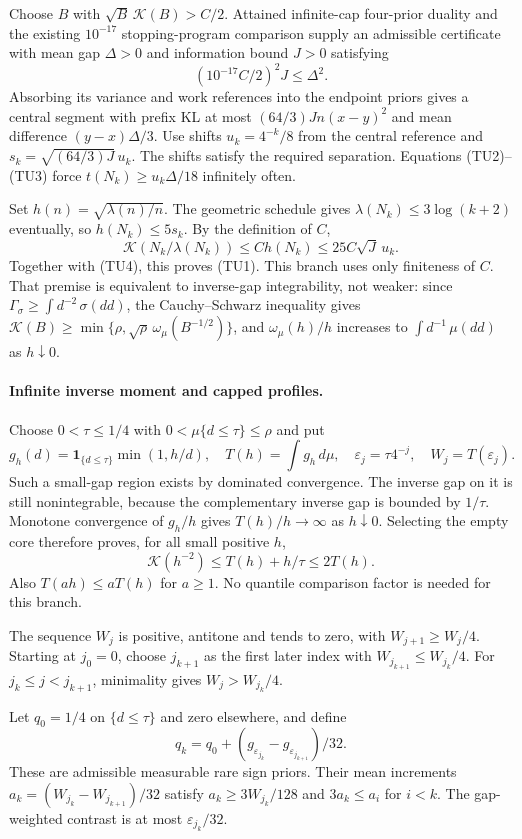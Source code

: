 Choose $B$ with $\sqrt B\,\mathcal K(B)>C/2$.
Attained infinite-cap four-prior duality and the existing
$10^{-17}$ stopping-program comparison supply an admissible certificate
with mean gap $\Delta>0$ and information bound $J>0$ satisfying
\[
 (10^{-17}C/2)^2J\le\Delta^2.
 \tag{TU4}
\]
Absorbing its variance and work references into the endpoint priors gives
a central segment with prefix KL at most
$(64/3)Jn(x-y)^2$ and mean difference $(y-x)\Delta/3$.
Use shifts $u_k=4^{-k}/8$ from the central reference and
$s_k=\sqrt{(64/3)J}\,u_k$. The shifts satisfy the required separation.
Equations (TU2)--(TU3) force $t(N_k)\ge u_k\Delta/18$ infinitely often.

Set $h(n)=\sqrt{\lambda(n)/n}$. The geometric schedule gives
$\lambda(N_k)\le3\log(k+2)$ eventually, so $h(N_k)\le5s_k$.
By the definition of $C$,
\[
 \mathcal K(N_k/\lambda(N_k))
 \le C h(N_k)\le25C\sqrt J\,u_k.
 \tag{TU5}
\]
Together with (TU4), this proves (TU1). This branch uses only finiteness
of $C$. That premise is equivalent to inverse-gap integrability, not
weaker: since $\Gamma_\sigma\ge\int d^{-2}\,\sigma(dd)$, the Cauchy--Schwarz
inequality gives
$\mathcal K(B)\ge\min\{\rho,\sqrt\rho\,\omega_\mu(B^{-1/2})\}$, and
$\omega_\mu(h)/h$ increases to $\int d^{-1}\,\mu(dd)$ as $h\downarrow0$.

\paragraph{Infinite inverse moment and capped profiles.}
Choose $0<\tau\le1/4$ with $0<\mu\{d\le\tau\}\le\rho$ and put
\[
 g_h(d)=\mathbf1_{\{d\le\tau\}}\min(1,h/d),\quad
 T(h)=\int g_h\,d\mu,\quad
 \varepsilon_j=\tau4^{-j},\quad W_j=T(\varepsilon_j).
\]
Such a small-gap region exists by dominated convergence. The inverse gap
on it is still nonintegrable, because the complementary inverse gap is
bounded by $1/\tau$. Monotone convergence of $g_h/h$ gives
$T(h)/h\to\infty$ as $h\downarrow0$.
Selecting the empty core therefore proves, for all small positive $h$,
\[
 \mathcal K(h^{-2})\le T(h)+h/\tau\le2T(h).
 \tag{TU6}
\]
Also $T(ah)\le aT(h)$ for $a\ge1$. No quantile comparison factor is needed
for this branch.

The sequence $W_j$ is positive, antitone and tends to zero, with
$W_{j+1}\ge W_j/4$. Starting at $j_0=0$, choose $j_{k+1}$ as the first
later index with $W_{j_{k+1}}\le W_{j_k}/4$.
For $j_k\le j<j_{k+1}$, minimality gives $W_j>W_{j_k}/4$.

Let $q_0=1/4$ on $\{d\le\tau\}$ and zero elsewhere, and define
\[
 q_k=q_0+(g_{\varepsilon_{j_k}}-g_{\varepsilon_{j_{k+1}}})/32.
\]
These are admissible measurable rare sign priors. Their mean increments
$a_k=(W_{j_k}-W_{j_{k+1}})/32$ satisfy
$a_k\ge3W_{j_k}/128$ and $3a_k\le a_i$ for $i<k$.
The gap-weighted contrast is at most $\varepsilon_{j_k}/32$.

